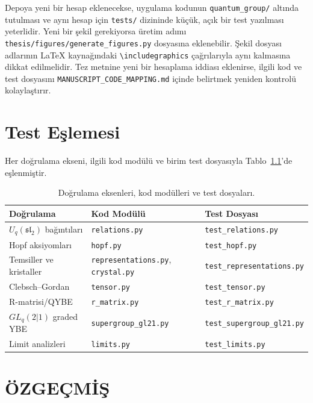 \documentclass[12pt,a4paper,fleqn]{report}
\numberwithin{equation}{chapter}
\theoremstyle{plain}
\theoremstyle{definition}
\renewcommand{\sl}{\mathfrak{sl}}
\begin{document}
Depoya yeni bir hesap eklenecekse, uygulama kodunun
\texttt{quantum\_group/} altında tutulması ve aynı hesap için \texttt{tests/}
dizininde küçük, açık bir test yazılması yeterlidir. Yeni bir şekil gerekiyorsa
üretim adımı \texttt{thesis/figures/generate\_figures.py} dosyasına eklenebilir.
Şekil dosyası adlarının LaTeX kaynağındaki
\texttt{\textbackslash includegraphics} çağrılarıyla aynı kalmasına dikkat
edilmelidir. Tez metnine yeni bir hesaplama iddiası eklenirse, ilgili kod ve
test dosyasını \texttt{MANUSCRIPT\_CODE\_MAPPING.md} içinde belirtmek yeniden
kontrolü kolaylaştırır.

\chapter{Test Eşlemesi}

Her doğrulama ekseni, ilgili kod modülü ve birim test dosyasıyla
Tablo~\ref{tab:tests}'de eşlenmiştir.

\begin{table}[H]
\centering
\footnotesize
\caption{Doğrulama eksenleri, kod modülleri ve test dosyaları.}
\label{tab:tests}
\begin{tabularx}{\textwidth}{@{}>{\raggedright\arraybackslash}p{}X>{\raggedright\arraybackslash}p{}@{}}
\toprule
Doğrulama & Kod Modülü & Test Dosyası \\
\midrule
$U_q(\sl_2)$ bağıntıları & \texttt{relations.py} & \texttt{test\_relations.py} \\
Hopf aksiyomları & \texttt{hopf.py} & \texttt{test\_hopf.py} \\
Temsiller ve kristaller & \texttt{representations.py}, \texttt{crystal.py} & \texttt{test\_representations.py} \\
Clebsch--Gordan & \texttt{tensor.py} & \texttt{test\_tensor.py} \\
R-matrisi/QYBE & \texttt{r\_matrix.py} & \texttt{test\_r\_matrix.py} \\
$GL_q(2|1)$ graded YBE & \texttt{supergroup\_gl21.py} & \texttt{test\_supergroup\_gl21.py} \\
Limit analizleri & \texttt{limits.py} & \texttt{test\_limits.py} \\
\bottomrule
\end{tabularx}
\end{table}

\FloatBarrier

\clearpage
\chapter*{ÖZGEÇMİŞ}
\end{document}

